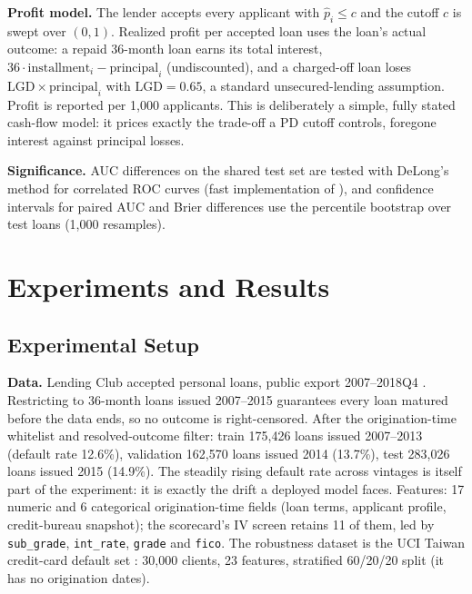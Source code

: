 \documentclass[a4paper,twocolumn,10pt]{article}
\begin{document}
\textbf{Profit model.} The lender accepts every applicant with $\hat p_i \le c$ and the cutoff $c$ is swept over $(0,1)$. Realized profit per accepted loan uses the loan's actual outcome: a repaid 36-month loan earns its total interest, $36 \cdot \text{installment}_i - \text{principal}_i$ (undiscounted), and a charged-off loan loses $\mathrm{LGD} \times \text{principal}_i$ with $\mathrm{LGD} = 0.65$, a standard unsecured-lending assumption. Profit is reported per 1{,}000 applicants. This is deliberately a simple, fully stated cash-flow model: it prices exactly the trade-off a PD cutoff controls, foregone interest against principal losses.

\textbf{Significance.} AUC differences on the shared test set are tested with DeLong's method for correlated ROC curves \cite{delong1988} (fast implementation of \cite{sun2014}), and confidence intervals for paired AUC and Brier differences use the percentile bootstrap over test loans (1{,}000 resamples).

\section{Experiments and Results}

\subsection{Experimental Setup}

\textbf{Data.} Lending Club accepted personal loans, public export 2007--2018Q4 \cite{lendingclubdata}. Restricting to 36-month loans issued 2007--2015 guarantees every loan matured before the data ends, so no outcome is right-censored. After the origination-time whitelist and resolved-outcome filter: train 175{,}426 loans issued 2007--2013 (default rate 12.6\%), validation 162{,}570 loans issued 2014 (13.7\%), test 283{,}026 loans issued 2015 (14.9\%). The steadily rising default rate across vintages is itself part of the experiment: it is exactly the drift a deployed model faces. Features: 17 numeric and 6 categorical origination-time fields (loan terms, applicant profile, credit-bureau snapshot); the scorecard's IV screen retains 11 of them, led by \texttt{sub\_grade}, \texttt{int\_rate}, \texttt{grade} and \texttt{fico}. The robustness dataset is the UCI Taiwan credit-card default set \cite{yeh2009}: 30{,}000 clients, 23 features, stratified 60/20/20 split (it has no origination dates).
\end{document}

